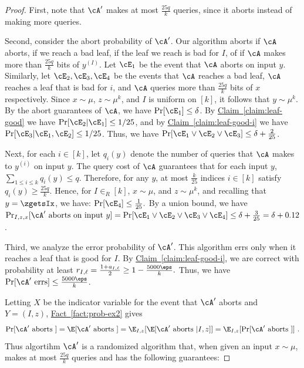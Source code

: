 \documentclass[11pt]{article}
\numberwithin{equation}{section}
\theoremstyle{definition}
\theoremstyle{plain}
\newcommand{\expref}[2]{\hyperref[#2]{#1~\ref{#2}}}
\begin{document}
\begin{proof}
First, note that $\cA'$ makes at most $\frac{25q}{k}$ queries, since
it aborts instead of making more queries.

Second, consider the abort probability of $\cA'$.  Our algorithm
aborts if $\cA$ aborts, if we reach a bad leaf, if the leaf we reach
is bad for $I$, of if $\cA$ makes more than $\frac{25q}{k}$ bits of
$y^{(I)}$.  Let $\cE_1$ be the event that $\cA$ aborts on input $y$.
Similarly, let $\cE_2,\cE_3,\cE_4$ be the events that $\cA$ reaches a
bad leaf, $\cA$ reaches a leaf that is bad for $i$, and $\cA$ queries
more than $\frac{25q}{k}$ bits of $x$ respectively.  Since
$x\sim \mu$, $z \sim \mu^k$, and $I$ is uniform on $[k]$, it follows
that $y\sim \mu^k$.  By the abort guarantees of $\cA$, we have
$\Pr[\cE_1] \leq \delta$.  By \expref{Claim}{claim:leaf-good} we have
$\Pr[\cE_2 | \cE_1] \leq 1/25$, and by \expref{Claim}{claim:leaf-good-i}
we have $\Pr[\cE_3 | \cE_1,\cE_2] \leq 1/25$.  Thus, we have
$\Pr[\cE_1\vee \cE_2 \vee \cE_3] \leq \delta +\frac{2}{25}$.


Next, for each $i \in [k]$, let $q_i(y)$ denote the number of queries
that $\cA$ makes to $y^{(i)}$ on input $y$.  The query cost of $\cA$
guarantees that for each input $y$,
$\sum_{1\leq i\leq k} q_i(y) \leq q$.  Therefore, for any $y$, at most
$\frac{k}{25}$ indices $i\in [k]$ satisfy $q_i(y) \geq \frac{25q}{k}$.
Hence, for $I \in_R [k]$, $x\sim \mu$, and $z \sim \mu^k$, and
recalling that $y = \zgetsIx$, we have:
$\Pr[\cE_4] \leq \frac{1}{25}.$ By a union bound, we have
$\Pr_{I,z,x}[\cA' \text{ aborts on input } y] = \Pr[\cE_1 \vee \cE_2
\vee \cE_3 \vee \cE_4] \leq \delta + \frac{3}{25}=
\delta+0.12$.

Third, we analyze the error probability of $\cA'$.  This algorithm
errs only when it reaches a leaf that is good for $I$.  By
\expref{Claim}{claim:leaf-good-i}, we are correct with probability at
least
$r_{I,\ell} = \frac{1+a_{I,\ell}}{2} \geq 1-\frac{5000\eps}{k}.$
Thus, we have $\Pr[\cA' \text{ errs}] \leq \frac{5000\eps}{k}$.

%
Letting $X$ be the indicator variable for the event that $\cA'$ aborts
and $Y = (I,z)$, \expref{Fact}{fact:prob-ex2} gives
$$\Pr[\cA' \text{ aborts }] = \E[\cA' \text{ aborts }] =
\E_{I,z}[\E[\cA' \text{ aborts } | I,z]] = \E_{I,z}[\Pr[\cA' \text{
  aborts }]]\ .$$ Thus algortihm $\cA'$ is a randomized algorithm
that, when given an input $x \sim \mu$, makes at most $\frac{25q}{k}$
queries and has the following guarantees:


\end{proof}
\end{document}
